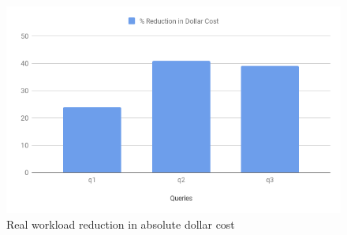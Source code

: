 \begin{figure}[h]
	\includegraphics[width=\linewidth]{ModelExp.png}
	\caption{Real workload reduction in absolute dollar cost}
	\label{fig:modelbaseddollarresult}
\end{figure}
